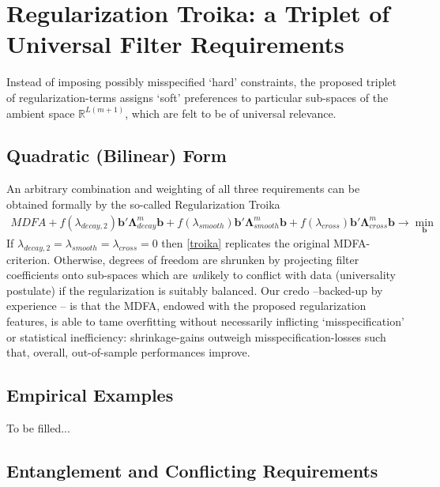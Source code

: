 \documentclass[a4paper]{book}
\begin{document}
\section{Regularization Troika: a Triplet of Universal Filter Requirements}\label{reg_troika_uni_req}

Instead of imposing possibly misspecified `hard' constraints, the proposed triplet of regularization-terms assigns `soft' preferences to particular sub-spaces of the ambient space $\mathbb{R}^{L(m+1)}$, which are felt to be of universal relevance. 

\subsection{Quadratic (Bilinear) Form}

An arbitrary combination and weighting of all three requirements can be obtained formally by the so-called Regularization Troika    
\begin{eqnarray}\label{troika}
MDFA+f(\lambda_{decay,2})\mathbf{b}'\boldsymbol{\Lambda}_{decay}^m\mathbf{b}+f(\lambda_{smooth})\mathbf{b}'\boldsymbol{\Lambda}_{smooth}^m\mathbf{b}+f(\lambda_{cross})\mathbf{b}'\boldsymbol{\Lambda}_{cross}^m\mathbf{b}\to \min_{\mathbf{b}}
\end{eqnarray}
If $\lambda_{decay,2}=\lambda_{smooth}=\lambda_{cross}=0$ then \ref{troika} replicates the original MDFA-criterion. Otherwise, degrees of freedom are shrunken by projecting filter coefficients onto sub-spaces which are \emph{un}likely to conflict with data (universality postulate) if the regularization is suitably balanced. Our credo --backed-up by experience -- is that the MDFA, endowed with the proposed regularization features, is able to tame overfitting without necessarily inflicting `misspecification' or statistical inefficiency: shrinkage-gains outweigh misspecification-losses such that, overall, out-of-sample performances improve.    



\subsection{Empirical Examples}

To be filled...


\subsection{Entanglement and Conflicting Requirements}
\end{document}
